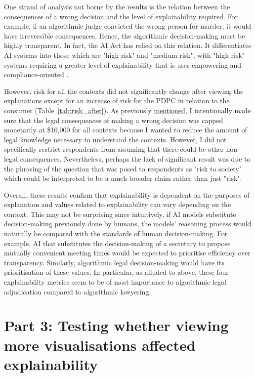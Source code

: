 One strand of analysis not borne by the results is the relation between the consequences of a wrong decision and the level of explainability required. For example, if an algorithmic judge convicted the wrong person for murder, it would have irreversible consequences. Hence, the algorithmic decision-making must be highly transparent. In fact, the AI Act has relied on this relation. It differentiates AI systems into those which are "high risk" and "medium risk", with "high risk" systems requiring a greater level of explainability that is user-empowering and compliance-oriented \cite{sovrano2022metrics}.

However, risk for all the contexts did not significantly change after viewing the explanations except for an increase of risk for the PDPC in relation to the consumer (Table~\ref{tab:risk_after}). As previously \hyperref[sec:survey_method]{mentioned}, I intentionally made sure that the legal consequences of making a wrong decision was capped monetarily at \$10,000 for all contexts because I wanted to reduce the amount of legal knowledge necessary to understand the contexts. However, I did not specifically restrict respondents from assuming that there could be other non-legal consequences. Nevertheless, perhaps the lack of significant result was due to the phrasing of the question that was posed to respondents as "risk to society" which could be interpreted to be a much broader claim rather than just "risk".

Overall, these results confirm that explainability is dependent on the purposes of explanation and values related to explainability can vary depending on the context. This may not be surprising since intuitively, if AI models substitute decision-making previously done by humans, the models' reasoning process would naturally be compared with the standards of human decision-making. For example, AI that substitutes the decision-making of a secretary to propose mutually convenient meeting times would be expected to prioritise efficiency over transparency. Similarly, algorithmic legal decision-making would have its prioritisation of these values. In particular, as alluded to above, these four explainability metrics seem to be of most importance to algorithmic legal adjudication compared to algorithmic lawyering.

\section{Part 3: Testing whether viewing more visualisations affected explainability}
